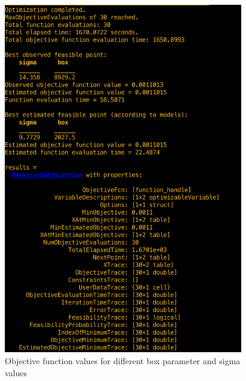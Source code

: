 \begin{figure}
\begin{center}
\includegraphics[width=0.93\textwidth]{figures/optimizationResultsStuckFault}    %
\caption{Objective function values for different box parameter and sigma values} 
\label{fig:objFuncModel}
\end{center}
\end{figure}

